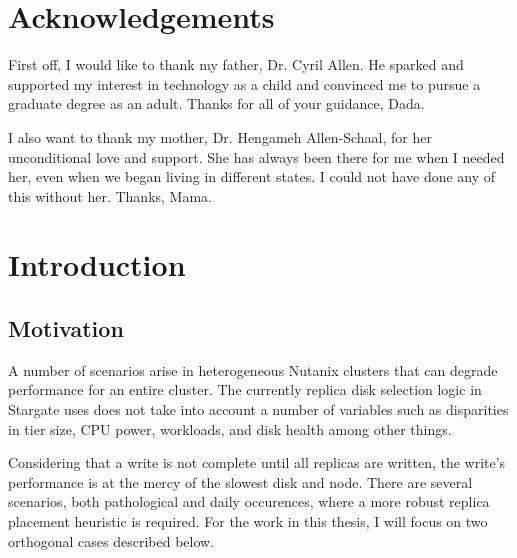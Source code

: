 \documentclass[12pt]{article}
\begin{document}
\section*{Acknowledgements}
\thispagestyle{empty}

First off, I would like to thank my father, Dr. Cyril Allen. He sparked  and
supported my interest in technology as a child and convinced me to pursue a
graduate degree as an adult. Thanks for all of your guidance, Dada.

I also want to thank my mother, Dr. Hengameh Allen-Schaal, for her
unconditional love and support. She has always been there for me when I needed
her, even when we began living in different states. I could not have done any
of this without her. Thanks, Mama.





\clearpage
\newpage


\tableofcontents
\newpage

\listoffigures
\newpage

\listoftables


\newpage
\section{Introduction}

  \subsection{Motivation}

  A number of scenarios arise in heterogeneous Nutanix clusters that can
  degrade performance for an entire cluster. The currently replica disk
  selection logic in Stargate uses does not take into account a number of
  variables such as disparities in tier size, CPU power, workloads, and disk
  health among other things.

  Considering that a write is not complete until all replicas are written, the
  write's performance is at the mercy of the slowest disk and node.  There are
  several scenarios, both pathological and daily occurences, where a more
  robust replica placement heuristic is required. For the work in this thesis,
  I will focus on two orthogonal cases described below.
\end{document}
